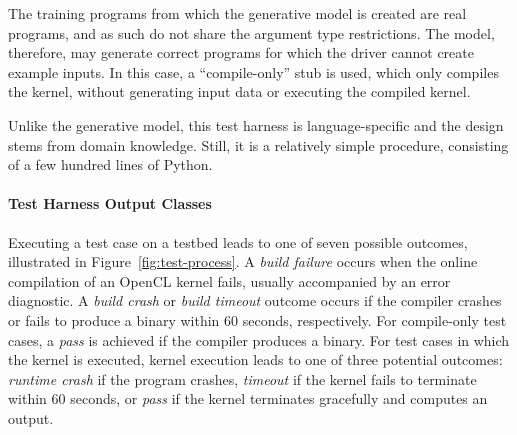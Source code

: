 The training programs from which the generative model is created are real programs, and as such do not share the argument type restrictions. The model, therefore, may generate correct programs for which the driver cannot create example inputs. In this case, a ``compile-only'' stub is used, which only compiles the kernel, without generating input data or executing the compiled kernel.

Unlike the generative model, this test harness is language-specific and the design stems from domain knowledge. Still, it is a relatively simple procedure, consisting of a few hundred lines of Python.

\paragraph*{Test Harness Output Classes}

Executing a test case on a testbed leads to one of seven possible outcomes, illustrated in Figure~\ref{fig:test-process}. A \emph{build failure} occurs when the online compilation of an OpenCL kernel fails, usually accompanied by an error diagnostic. A \emph{build crash} or \emph{build timeout} outcome occurs if the compiler crashes or fails to produce a binary within 60 seconds, respectively. For compile-only test cases, a \emph{pass} is achieved if the compiler produces a binary. For test cases in which the kernel is executed, kernel execution leads to one of three potential outcomes: \emph{runtime crash} if the program crashes, \emph{timeout} if the kernel fails to terminate within 60 seconds, or \emph{pass} if the kernel terminates gracefully and computes an output.

